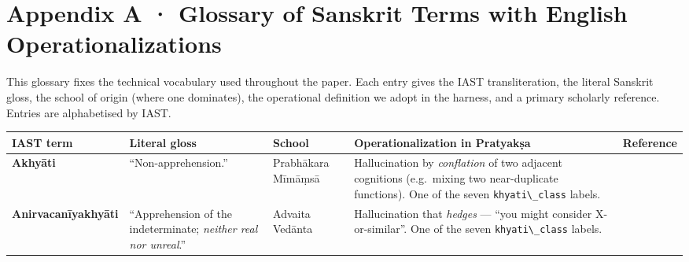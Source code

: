 \section{Appendix A · Glossary of Sanskrit Terms with English Operationalizations}\label{appendix-a-glossary-of-sanskrit-terms-with-english-operationalizations}

This glossary fixes the technical vocabulary used throughout the paper. Each entry gives the IAST transliteration, the literal Sanskrit gloss, the school of origin (where one dominates), the operational definition we adopt in the harness, and a primary scholarly reference. Entries are alphabetised by IAST.

{\def\LTcaptype{none} %
\begin{longtable}[]{@{}
  >{\raggedright\arraybackslash}p{}
  >{\raggedright\arraybackslash}p{}
  >{\raggedright\arraybackslash}p{}
  >{\raggedright\arraybackslash}p{}
  >{\raggedright\arraybackslash}p{}@{}}
\toprule\noalign{}
\begin{minipage}[b]{\linewidth}\raggedright
IAST term
\end{minipage} & \begin{minipage}[b]{\linewidth}\raggedright
Literal gloss
\end{minipage} & \begin{minipage}[b]{\linewidth}\raggedright
School
\end{minipage} & \begin{minipage}[b]{\linewidth}\raggedright
Operationalization in Pratyakṣa
\end{minipage} & \begin{minipage}[b]{\linewidth}\raggedright
Reference
\end{minipage} \\
\midrule\noalign{}
\endhead
\bottomrule\noalign{}
\endlastfoot
\textbf{Akhyāti} & ``Non-apprehension.'' & Prabhākara Mīmāṃsā & Hallucination by \emph{conflation} of two adjacent cognitions (e.g.~mixing two near-duplicate functions). One of the seven \passthrough{\lstinline!khyati\_class!} labels. & \citep{bhatt1989prabhakara, datta1932advaita} \\
\textbf{Anirvacanīyakhyāti} & ``Apprehension of the indeterminate; \emph{neither real nor unreal}.'' & Advaita Vedānta & Hallucination that \emph{hedges} --- ``you might consider X-or-similar''. One of the seven \passthrough{\lstinline!khyati\_class!} labels. & \citep{ram2007error, deutsch1969advaita} \\

\end{longtable}}
